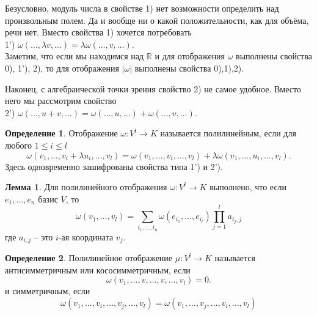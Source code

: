 \documentclass[10pt,a4paper,oneside]{book} %
\theoremstyle{definition}
\newtheorem*{defn}{Определение}
\newtheorem{lem}{Лемма}
\newcommand{\mb}[1]{\mathbb{#1}}
\def\lm{\begin{lem}}
\def\elm{\end{lem}}
\begin{document}
Безусловно, модуль числа в свойстве 1) нет возможности определить над произвольным полем. Да и вообще ни о какой положительности, как для объёма, речи нет. Вместо свойства 1) хочется потребовать\\
1') $\omega(\dots,\lambda v,\dots)=\lambda \omega(\dots,v,\dots)$.\\
Заметим, что если мы находимся над $\mb R$ и  для отображения $\omega$ выполнены свойства 0), 1'), 2), то для отображения $|\omega|$ выполнены свойства 0),1),2). 

Наконец, с алгебраической точки зрения свойство 2) не самое удобное. Вместо него мы рассмотрим свойство\\
2') $\omega(\dots,u+v,\dots)=\omega(\dots,u,\dots)+\omega(\dots,v,\dots)$.


\begin{defn}
Отображение $\omega \colon  V^l\to K $ называется полилинейным, если для любого $1\leq i\leq l$
$$\omega(v_1,\dots,v_i+\lambda u_i,\dots, v_l)= \omega(v_1,\dots,v_i,\dots, v_l)+\lambda\omega(v_1,\dots,u_i,\dots, v_l).$$
Здесь одновременно зашифрованы свойства типа 1')  и  2').
\end{defn}

\lm Для полилинейного отображения $\omega \colon V^l \to K $ выполнено, что если $e_1,\dots,e_n$ базис $V$, то
$$\omega(v_1,\dots,v_l)=\sum_{i_1,\dots,i_n} \omega(e_{i_1},\dots,e_{i_l}) \prod_{j=1}^l a_{i_j,j}$$
где $a_{i,j}$ -- это $i$-ая координата $v_j$.\\
\elm

\begin{defn}
Полилинейное отображение $\mu \colon V^l\to K $ называется антисимметричным или кососимметричным, если
$$\omega(v_1,\dots,v,\dots,v,\dots, v_l)=0.$$ и симметричным, если
$$\omega(v_1,\dots,v_i,\dots,v_j,\dots, v_l)=\omega(v_1,\dots,v_j,\dots,v_i,\dots, v_l)$$
\end{defn}
\end{document}
